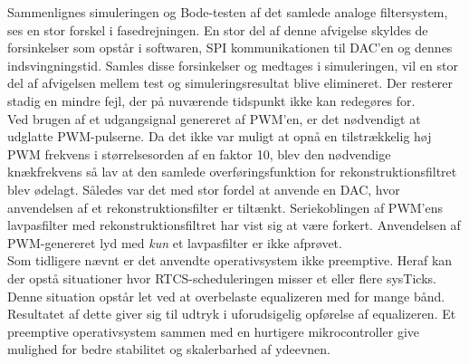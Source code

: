 
Sammenlignes simuleringen og Bode-testen af det samlede analoge filtersystem, ses en stor forskel i fasedrejningen. 
En stor del af denne afvigelse skyldes de forsinkelser som opstår i softwaren, SPI kommunikationen til DAC'en og dennes indsvingningstid. 
Samles disse forsinkelser og medtages i simuleringen, vil en stor del af afvigelsen mellem test og simuleringsresultat blive elimineret. 
Der resterer stadig en mindre fejl, der på nuværende tidspunkt ikke kan redegøres for. \\



Ved brugen af et udgangsignal genereret af PWM'en, er det nødvendigt at udglatte PWM-pulserne. 
Da det ikke var muligt at opnå en tilstrækkelig høj PWM frekvens i størrelsesorden af en faktor 10, blev den nødvendige knækfrekvens så lav at den samlede overføringsfunktion for rekonstruktionsfiltret blev ødelagt. 
Således var det med stor fordel at anvende en DAC, hvor anvendelsen af et rekonstruktionsfilter er tiltænkt. 
Seriekoblingen af PWM'ens lavpasfilter med rekonstruktionsfiltret har vist sig at være forkert. 
Anvendelsen af PWM-genereret lyd med \textit{kun} et lavpasfilter er ikke afprøvet.\\



Som tidligere nævnt er det anvendte operativsystem ikke preemptive. Heraf kan der opstå situationer hvor RTCS-scheduleringen misser et eller flere sysTicks. Denne situation opstår let ved at overbelaste equalizeren med for mange bånd. Resultatet af dette giver sig til udtryk i uforudsigelig opførelse af equalizeren. 
Et preemptive operativsystem sammen med en hurtigere mikrocontroller give mulighed for bedre stabilitet og skalerbarhed af ydeevnen. 






 
